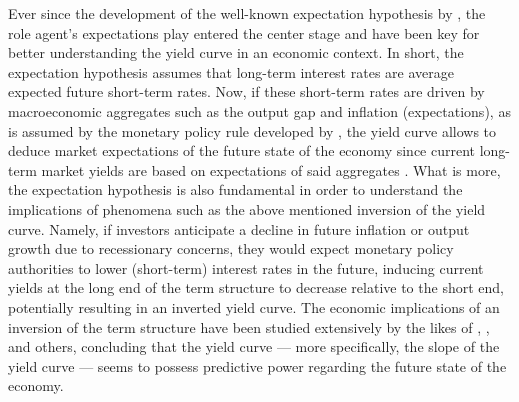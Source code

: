 Ever since the development of the well-known expectation hypothesis by \citet{hicks1946value}, the role agent's expectations play entered the center stage and have been key for better understanding the yield curve in an economic context.
In short, the expectation hypothesis assumes that long-term interest rates are average expected future short-term rates. 
Now, if these short-term rates are driven by macroeconomic aggregates such as the output gap and inflation (expectations), as is assumed by the monetary policy rule developed by \citet{taylor1993discretion}, the yield curve allows to deduce market expectations of the future state of the economy since current long-term market yields are based on expectations of said aggregates \citep{Gürkaynak_Wright_2012}. 
What is more, the expectation hypothesis is also fundamental in order to understand the implications of phenomena such as the above mentioned inversion of the yield curve. 
Namely, if investors anticipate a decline in future inflation or output growth due to recessionary concerns, they would expect monetary policy authorities to lower (short-term) interest rates in the future, inducing current yields at the long end of the term structure to decrease relative to the short end, potentially resulting in an inverted yield curve. The economic implications of an inversion of the term structure have been studied extensively by the likes of \citet{estrella1991term}, \citet{estrella1995term}, \citet{stock2003did} and others, concluding that the yield curve --- more specifically, the slope of the yield curve --- seems to possess predictive power regarding the future state of the economy. 

